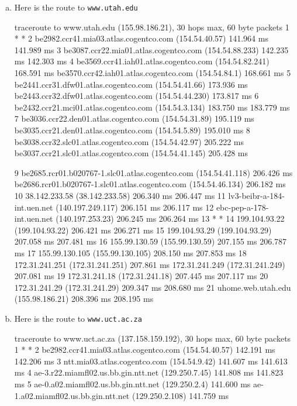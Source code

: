 \documentclass{article}
\begin{document}
\begin{enumerate}[a.]
\item Here is the route to {\tt www.utah.edu}
\begin{code}
traceroute to www.utah.edu (155.98.186.21), 30 hops max, 60 byte packets
 1  * *
 2  be2982.ccr41.mia03.atlas.cogentco.com (154.54.40.57)  141.964 ms  141.989 ms
 3  be3087.ccr22.mia01.atlas.cogentco.com (154.54.88.233)  142.235 ms  142.303 ms
 4  be3569.ccr41.iah01.atlas.cogentco.com (154.54.82.241)  168.591 ms be3570.ccr42.iah01.atlas.cogentco.com (154.54.84.1)  168.661 ms
 5  be2441.ccr31.dfw01.atlas.cogentco.com (154.54.41.66)  173.936 ms be2443.ccr32.dfw01.atlas.cogentco.com (154.54.44.230)  173.817 ms
 6  be2432.ccr21.mci01.atlas.cogentco.com (154.54.3.134)  183.750 ms  183.779 ms
 7  be3036.ccr22.den01.atlas.cogentco.com (154.54.31.89)  195.119 ms be3035.ccr21.den01.atlas.cogentco.com (154.54.5.89)  195.010 ms
 8  be3038.ccr32.slc01.atlas.cogentco.com (154.54.42.97)  205.222 ms be3037.ccr21.slc01.atlas.cogentco.com (154.54.41.145)  205.428 ms
 \end{code}
 \begin{code}
 9  be2685.rcr01.b020767-1.slc01.atlas.cogentco.com (154.54.41.118)  206.426 ms be2686.rcr01.b020767-1.slc01.atlas.cogentco.com (154.54.46.134)  206.182 ms
10  38.142.233.58 (38.142.233.58)  206.340 ms  206.447 ms
11  lv3-beibr-a-184-int.uen.net (140.197.249.117)  206.151 ms  206.117 ms
12  ebc-pep-a-178-int.uen.net (140.197.253.23)  206.245 ms  206.264 ms
13  * *
14  199.104.93.22 (199.104.93.22)  206.421 ms  206.271 ms
15  199.104.93.29 (199.104.93.29)  207.058 ms  207.481 ms
16  155.99.130.59 (155.99.130.59)  207.155 ms  206.787 ms
17  155.99.130.105 (155.99.130.105)  208.150 ms  207.853 ms
18  172.31.241.251 (172.31.241.251)  207.861 ms 172.31.241.249 (172.31.241.249)  207.081 ms
19  172.31.241.18 (172.31.241.18)  207.445 ms  207.117 ms
20  172.31.241.29 (172.31.241.29)  209.347 ms  208.680 ms
21  uhome.web.utah.edu (155.98.186.21)  208.396 ms  208.195 ms
\end{code}
\item Here is the route to {\tt www.uct.ac.za}
\begin{code}
traceroute to www.uct.ac.za (137.158.159.192), 30 hops max, 60 byte packets
 1  * *
 2  be2982.ccr41.mia03.atlas.cogentco.com (154.54.40.57)  142.191 ms  142.206 ms
 3  ntt.mia03.atlas.cogentco.com (154.54.9.42)  141.607 ms  141.613 ms
 4  ae-3.r22.miamfl02.us.bb.gin.ntt.net (129.250.7.45)  141.808 ms  141.823 ms
 5  ae-0.a02.miamfl02.us.bb.gin.ntt.net (129.250.2.4)  141.600 ms ae-1.a02.miamfl02.us.bb.gin.ntt.net (129.250.2.108)  141.759 ms

\end{code}
\end{enumerate}
\end{document}
